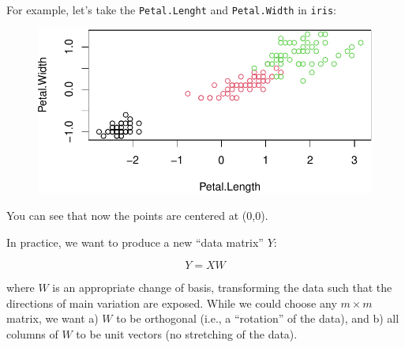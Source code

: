 \documentclass[
  letterpaper,
  DIV=11,
  numbers=noendperiod]{scrreprt}
\newenvironment{Shaded}{\begin{snugshade}}{\end{snugshade}}
\newcommand{\AttributeTok}[1]{\textcolor[rgb]{0.40,0.45,0.13}{#1}}
\newcommand{\CommentTok}[1]{\textcolor[rgb]{0.37,0.37,0.37}{#1}}
\newcommand{\ConstantTok}[1]{\textcolor[rgb]{0.56,0.35,0.01}{#1}}
\newcommand{\FunctionTok}[1]{\textcolor[rgb]{0.28,0.35,0.67}{#1}}
\newcommand{\NormalTok}[1]{\textcolor[rgb]{0.00,0.23,0.31}{#1}}
\newcommand{\OtherTok}[1]{\textcolor[rgb]{0.00,0.23,0.31}{#1}}
\newcommand{\SpecialCharTok}[1]{\textcolor[rgb]{0.37,0.37,0.37}{#1}}
\begin{document}
For example, let's take the \texttt{Petal.Lenght} and
\texttt{Petal.Width} in \texttt{iris}:

\begin{Shaded}
\end{Shaded}

\begin{figure}[H]

{\centering \includegraphics{./11-SVD_PCA_files/figure-pdf/unnamed-chunk-7-1.pdf}

}

\end{figure}

You can see that now the points are centered at (0,0).

In practice, we want to produce a new ``data matrix'' \(Y\):

\[
Y = XW
\]

where \(W\) is an appropriate change of basis, transforming the data
such that the directions of main variation are exposed. While we could
choose any \(m \times m\) matrix, we want a) \(W\) to be orthogonal
(i.e., a ``rotation'' of the data), and b) all columns of \(W\) to be
unit vectors (no stretching of the data).
\end{document}

